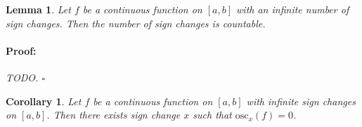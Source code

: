 \documentclass{article}
\newenvironment{proof}{\paragraph{Proof:}}{\hfill$\square$}
\newtheorem{lemma}[theorem]{Lemma}
\newtheorem{corollary}[theorem]{Corollary}
\newcommand{\osc}{\text{osc}}
\begin{document}
\begin{lemma}
Let $f$ be a continuous function on $[a, b]$ with an infinite number of sign changes. Then the number of sign changes is countable.
\begin{proof}
TODO.
\end{proof}
\end{lemma}

\begin{corollary}
Let $f$ be a continuous function on $[a, b]$ with infinite sign changes on $[a, b]$. Then there exists sign change $x$ such that $\osc_x(f) = 0$.
\end{corollary}
\end{document}
